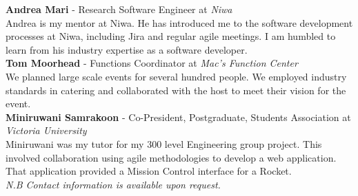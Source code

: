 \documentclass[9pt]{developercv}
\begin{document}

\textbf{Andrea Mari} - Research Software Engineer at \emph{Niwa} \\
Andrea is my mentor at Niwa. He has introduced me to the software development processes at Niwa, including Jira and regular agile meetings. I am humbled to learn from his industry expertise as a software developer.\\

\textbf{Tom Moorhead} - Functions Coordinator at \emph{Mac's Function Center} \\
We planned large scale events for several hundred people. We employed industry standards in catering and collaborated with the host to meet their vision for the event. \\

\textbf{Miniruwani Samrakoon} - Co-President, Postgraduate, Students Association at \emph{Victoria University} \\
Miniruwani was my tutor for my 300 level Engineering group project. This involved collaboration using agile methodologies to develop a web application. That application provided a Mission Control interface for a Rocket. \\

\emph{N.B Contact information is available upon request.}



\end{document}
